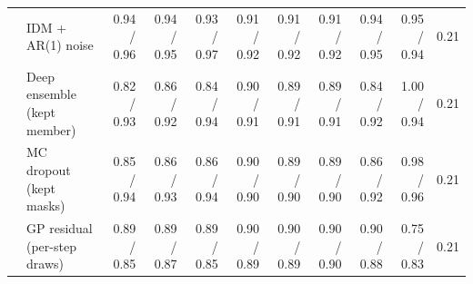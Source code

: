 \begin{longtable}{llrrrrrrrrr}
 & IDM + AR(1) noise & 0.94 / 0.96 & 0.94 / 0.95 & 0.93 / 0.97 & 0.91 / 0.92 & 0.91 / 0.92 & 0.91 / 0.92 & 0.94 / 0.95 & 0.95 / 0.94 & 0.21 \\
 & Deep ensemble (kept member) & 0.82 / 0.93 & 0.86 / 0.92 & 0.84 / 0.94 & 0.90 / 0.91 & 0.89 / 0.91 & 0.89 / 0.91 & 0.84 / 0.92 & 1.00 / 0.94 & 0.21 \\
 & MC dropout (kept masks) & 0.85 / 0.94 & 0.86 / 0.93 & 0.86 / 0.94 & 0.90 / 0.90 & 0.89 / 0.90 & 0.89 / 0.90 & 0.86 / 0.92 & 0.98 / 0.96 & 0.21 \\
 & GP residual (per-step draws) & 0.89 / 0.85 & 0.89 / 0.87 & 0.89 / 0.85 & 0.90 / 0.89 & 0.90 / 0.89 & 0.90 / 0.90 & 0.90 / 0.88 & 0.75 / 0.83 & 0.21 \\
\end{longtable}
\endgroup
